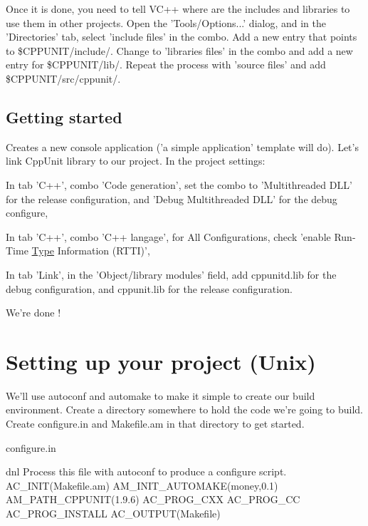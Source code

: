 Once it is done, you need to tell V\+C++ where are the includes and libraries to use them in other projects. Open the 'Tools/\+Options...' dialog, and in the 'Directories' tab, select 'include files' in the combo. Add a new entry that points to \$\+C\+P\+P\+U\+N\+I\+T/include/. Change to 'libraries files' in the combo and add a new entry for \$\+C\+P\+P\+U\+N\+I\+T/lib/. Repeat the process with 'source files' and add \$\+C\+P\+P\+U\+N\+I\+T/src/cppunit/.\hypertarget{money_example_sec_getting_started}{}\subsection{Getting started}\label{money_example_sec_getting_started}
Creates a new console application ('a simple application' template will do). Let's link Cpp\+Unit library to our project. In the project settings\+:
\begin{DoxyItemize}
\item In tab 'C++', combo 'Code generation', set the combo to 'Multithreaded D\+L\+L' for the release configuration, and 'Debug Multithreaded D\+L\+L' for the debug configure,
\item In tab 'C++', combo 'C++ langage', for All Configurations, check 'enable Run-\/\+Time \hyperlink{struct_type}{Type} Information (R\+T\+T\+I)',
\item In tab 'Link', in the 'Object/library modules' field, add cppunitd.\+lib for the debug configuration, and cppunit.\+lib for the release configuration.
\end{DoxyItemize}

We're done !\hypertarget{money_example_sec_setting_unix}{}\section{Setting up your project (\+Unix)}\label{money_example_sec_setting_unix}
We'll use {\ttfamily autoconf} and {\ttfamily automake} to make it simple to create our build environment. Create a directory somewhere to hold the code we're going to build. Create {\ttfamily configure.\+in} and {\ttfamily Makefile.\+am} in that directory to get started.

{\ttfamily configure.\+in} \begin{DoxyVerb}dnl Process this file with autoconf to produce a configure script.
AC_INIT(Makefile.am)
AM_INIT_AUTOMAKE(money,0.1)
AM_PATH_CPPUNIT(1.9.6)
AC_PROG_CXX
AC_PROG_CC
AC_PROG_INSTALL
AC_OUTPUT(Makefile)\end{DoxyVerb}



